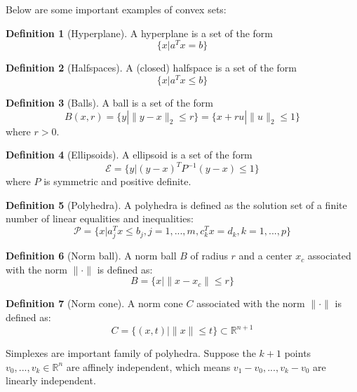 \documentclass[
]{book}
\theoremstyle{definition}
\newtheorem{definition}{Definition}[chapter]
\theoremstyle{definition}
\theoremstyle{definition}
\theoremstyle{definition}
\theoremstyle{remark}
\begin{document}
Below are some important examples of convex sets:

\begin{definition}[Hyperplane]
\protect\hypertarget{def:hyperplane}{}\label{def:hyperplane}A hyperplane is a set of the form \[\{x|a^Tx = b\}\]
\end{definition}

\begin{definition}[Halfspaces]
\protect\hypertarget{def:halfspaces}{}\label{def:halfspaces}A (closed) halfspace is a set of the form \[\{x|a^Tx \leq b\}\]
\end{definition}

\begin{definition}[Balls]
\protect\hypertarget{def:balls}{}\label{def:balls}A ball is a set of the form \[B(x,r) = \{y|\|y-x\|_2 \leq r\} = \{x+ru|\|u\|_2\leq 1\}\]
where \(r >0\).
\end{definition}

\begin{definition}[Ellipsoids]
\protect\hypertarget{def:ellipsoids}{}\label{def:ellipsoids}A ellipsoid is a set of the form \[\mathcal{E} = \{y|(y-x)^TP^{-1}(y-x)\leq 1\}\]
where \(P\) is symmetric and positive definite.
\end{definition}

\begin{definition}[Polyhedra]
\protect\hypertarget{def:polyhedra}{}\label{def:polyhedra}A polyhedra is defined as the solution set of a finite number of linear equalities
and inequalities: \[\mathcal{P} = \{x|a_j^Tx\leq b_j, j=1,...,m, c_k^Tx=d_k,k=1,...,p\}\]
\end{definition}

\begin{definition}[Norm ball]
\protect\hypertarget{def:normball}{}\label{def:normball}A norm ball \(B\) of radius \(r\) and a center \(x_c\) associated with the norm \(\|\cdot\|\) is defined as: \[B = \{x|\|x-x_c\|\leq r\}\]
\end{definition}

\begin{definition}[Norm cone]
\protect\hypertarget{def:normcone}{}\label{def:normcone}A norm cone \(C\) associated with the norm \(\|\cdot\|\) is defined as: \[C = \{(x,t)|\|x\|\leq t\}\subset \mathbb{R}^{n+1}\]
\end{definition}

Simplexes are important family of polyhedra. Suppose the \(k+1\) points \(v_0,...,v_k\in \mathbb{R}^n\) are affinely independent, which means \(v_1-v_0,...,v_k-v_0\) are linearly independent.
\end{document}

